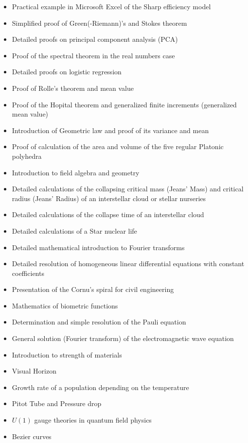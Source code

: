 \documentclass[12pt,a4paper,twoside,openright]{report}
\theoremstyle{definition}
\theoremstyle{itexmp}
\numberwithin{equation}{section}
\begin{document}
\begin{itemize}
\begin{itemize}[noitemsep]
			\item Practical example in Microsoft Excel of the Sharp efficiency model
			\item Simplified proof of Green(-Riemann)'s and Stokes theorem
			\item Detailed proofs on principal component analysis (PCA)
			\item Proof of the spectral theorem in the real numbers case
			\item Detailed proofs on logistic regression
			\item Proof of Rolle's theorem and mean value
			\item Proof of the Hopital theorem and generalized finite increments (generalized mean value)
			\item Introduction of Geometric law and proof of its variance and mean
			\item Proof of calculation of the area and volume of the five regular Platonic polyhedra
			\item Introduction to field algebra and geometry
			\item Detailed calculations of the collapsing critical mass (Jeans' Mass) and critical radius (Jeans' Radius) of an interstellar cloud or stellar nurseries
			\item Detailed calculations of the collapse time of an interstellar cloud
			\item Detailed calculations of a Star nuclear life
			\item Detailed mathematical introduction to Fourier transforms
			\item Detailed resolution of homogeneous linear differential equations with constant coefficients
			\item Presentation of the Cornu's spiral for civil engineering
			\item Mathematics of biometric functions
			\item Determination and simple resolution of the Pauli equation
			\item General solution (Fourier transform) of the electromagnetic wave equation
			\item Introduction to strength of materials
			\item Visual Horizon
			\item Growth rate of a population depending on the temperature
			\item Pitot Tube and Pressure drop
			\item $U(1)$ gauge theories in quantum field physics
			\item Bezier curves

\end{itemize}
\end{itemize}
\end{document}
